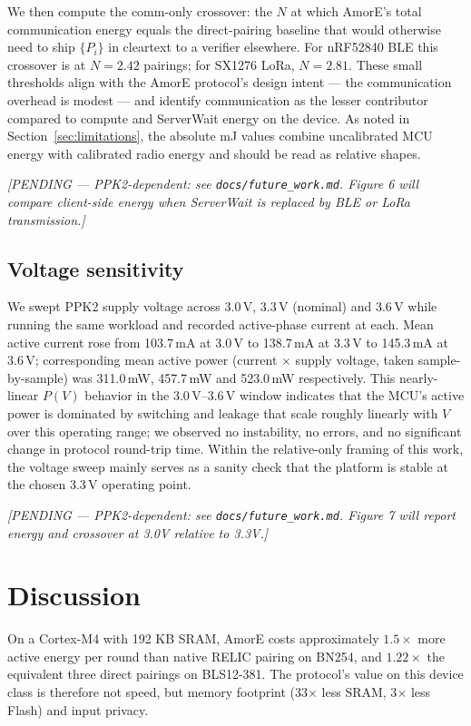 \documentclass[11pt,a4paper]{article}
\begin{document}
We then compute the comm-only crossover: the $N$ at which AmorE's
total communication energy equals the direct-pairing baseline that
would otherwise need to ship $\{P_i\}$ in cleartext to a verifier
elsewhere. For nRF52840 BLE this crossover is at $N\!=\!2.42$
pairings; for SX1276 LoRa, $N\!=\!2.81$. These small thresholds
align with the AmorE protocol's design intent --- the communication
overhead is modest --- and identify communication as the lesser
contributor compared to compute and ServerWait energy on the
device. As noted in Section~\ref{sec:limitations}, the absolute
mJ values combine uncalibrated MCU energy with calibrated radio
energy and should be read as relative shapes.



\textit{[PENDING — PPK2-dependent: see \texttt{docs/future\_work.md}.
Figure 6 will compare client-side energy when ServerWait is replaced
by BLE or LoRa transmission.]}

\subsection{Voltage sensitivity}

We swept PPK2 supply voltage across 3.0\,V, 3.3\,V (nominal) and
3.6\,V while running the same workload and recorded active-phase
current at each. Mean active current rose from 103.7\,mA at 3.0\,V
to 138.7\,mA at 3.3\,V to 145.3\,mA at 3.6\,V; corresponding mean
active power (current $\times$ supply voltage, taken
sample-by-sample) was 311.0\,mW, 457.7\,mW and 523.0\,mW respectively.
This nearly-linear $P(V)$ behavior in the 3.0\,V--3.6\,V window
indicates that the MCU's active power is dominated by switching
and leakage that scale roughly linearly with $V$ over this
operating range; we observed no instability, no errors, and no
significant change in protocol round-trip time. Within the
relative-only framing of this work, the voltage sweep mainly
serves as a sanity check that the platform is stable at the
chosen 3.3\,V operating point.



\textit{[PENDING — PPK2-dependent: see \texttt{docs/future\_work.md}.
Figure 7 will report energy and crossover at 3.0V relative to 3.3V.]}

\section{Discussion}

On a Cortex-M4 with 192 KB SRAM, AmorE costs approximately $1.5\times$
more active energy per round than native RELIC pairing on BN254, and
$1.22\times$ the equivalent three direct pairings on BLS12-381. The
protocol's value on this device class is therefore not speed, but
memory footprint (33$\times$ less SRAM, 3$\times$ less Flash) and
input privacy.
\end{document}
